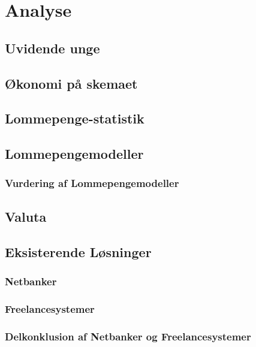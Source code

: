 \chapter{Analyse}

\section{Uvidende unge}
\label{UvidendeUnge}

\section{Økonomi på skemaet}
\label{Okonomi}

\section{Lommepenge-statistik}
\label{LommeStat}

\section{Lommepengemodeller}
\label{LommeModeller}
\subsection{Vurdering af Lommepengemodeller}
\label{ModelVurdering}

\section{Valuta}
\label{Valuta}

\section{Eksisterende Løsninger}
\subsection{Netbanker}
\subsection{Freelancesystemer}
\subsection{Delkonklusion af Netbanker og Freelancesystemer}
